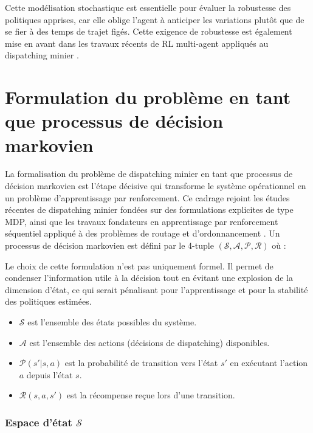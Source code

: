 \documentclass[11pt,a4paper]{report}
\begin{document}
Cette modélisation stochastique est essentielle pour évaluer la robustesse des politiques apprises, car elle oblige l'agent à anticiper les variations plutôt que de se fier à des temps de trajet figés. Cette exigence de robustesse est également mise en avant dans les travaux récents de RL multi-agent appliqués au dispatching minier \cite{Zhao2025HierarchicalMARL}.

\section{Formulation du problème en tant que processus de décision markovien}
\label{sec:mdp}

La formalisation du problème de dispatching minier en tant que processus de décision markovien est l'étape décisive qui transforme le système opérationnel en un problème d'apprentissage par renforcement. Ce cadrage rejoint les études récentes de dispatching minier fondées sur des formulations explicites de type MDP, ainsi que les travaux fondateurs en apprentissage par renforcement séquentiel appliqué à des problèmes de routage et d'ordonnancement \cite{MohammadrezaNazari2018, CongZhang2020, MarticorenaDAngelo2025}. Un processus de décision markovien est défini par le 4-tuple $(\mathcal{S}, \mathcal{A}, \mathcal{P}, \mathcal{R})$ où :

Le choix de cette formulation n'est pas uniquement formel. Il permet de condenser l'information utile à la décision tout en évitant une explosion de la dimension d'état, ce qui serait pénalisant pour l'apprentissage et pour la stabilité des politiques estimées.

\begin{itemize}
    \item $\mathcal{S}$ est l'ensemble des états possibles du système.
    \item $\mathcal{A}$ est l'ensemble des actions (décisions de dispatching) disponibles.
    \item $\mathcal{P}(s' | s, a)$ est la probabilité de transition vers l'état $s'$ en exécutant l'action $a$ depuis l'état $s$.
    \item $\mathcal{R}(s, a, s')$ est la récompense reçue lors d'une transition.
\end{itemize}

\subsubsection*{Espace d'état $\mathcal{S}$}
\end{document}
